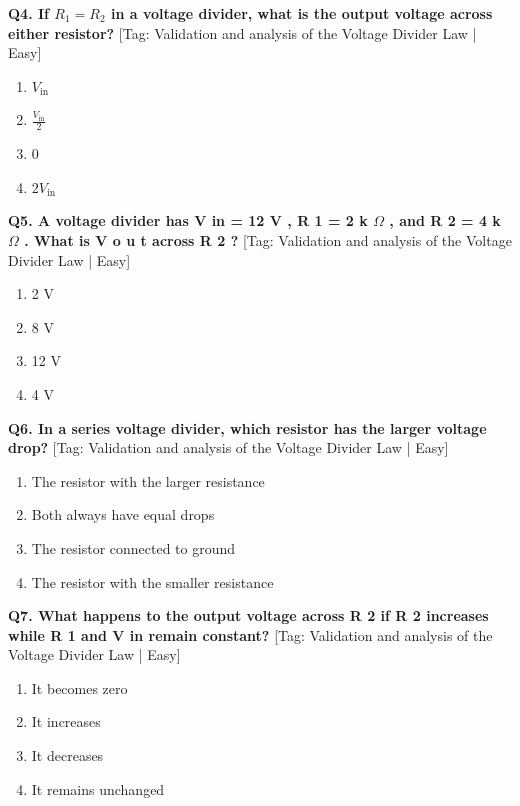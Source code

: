 \noindent\textbf{Q4. If $R_1 = R_2$ in a voltage divider, what is the output voltage across either resistor?} \hfill [Tag: Validation and analysis of the Voltage Divider Law | Easy]
\begin{enumerate}[label=(\alph*),topsep=2pt,itemsep=1pt,partopsep=0pt,parsep=0pt]
    \item {$V_{\mathrm{in}}$}
    \item {$\frac{V_{\mathrm{in}}}{2}$}
    \item {$0$}
    \item {$2 V_{\mathrm{in}}$}
\end{enumerate}
\vspace{2mm}

\noindent\textbf{Q5. A voltage divider has V in = 12 V , R 1 = 2 k $\Omega$ , and R 2 = 4 k $\Omega$ . What is V o u t across R 2 ?} \hfill [Tag: Validation and analysis of the Voltage Divider Law | Easy]
\begin{enumerate}[label=(\alph*),topsep=2pt,itemsep=1pt,partopsep=0pt,parsep=0pt]
    \item {2 V}
    \item {8 V}
    \item {12 V}
    \item {4 V}
\end{enumerate}
\vspace{2mm}

\noindent\textbf{Q6. In a series voltage divider, which resistor has the larger voltage drop?} \hfill [Tag: Validation and analysis of the Voltage Divider Law | Easy]
\begin{enumerate}[label=(\alph*),topsep=2pt,itemsep=1pt,partopsep=0pt,parsep=0pt]
    \item {The resistor with the larger resistance}
    \item {Both always have equal drops}
    \item {The resistor connected to ground}
    \item {The resistor with the smaller resistance}
\end{enumerate}
\vspace{2mm}

\noindent\textbf{Q7. What happens to the output voltage across R 2 if R 2 increases while R 1 and V in remain constant?} \hfill [Tag: Validation and analysis of the Voltage Divider Law | Easy]
\begin{enumerate}[label=(\alph*),topsep=2pt,itemsep=1pt,partopsep=0pt,parsep=0pt]
    \item {It becomes zero}
    \item {It increases}
    \item {It decreases}
    \item {It remains unchanged}
\end{enumerate}
\vspace{2mm}

